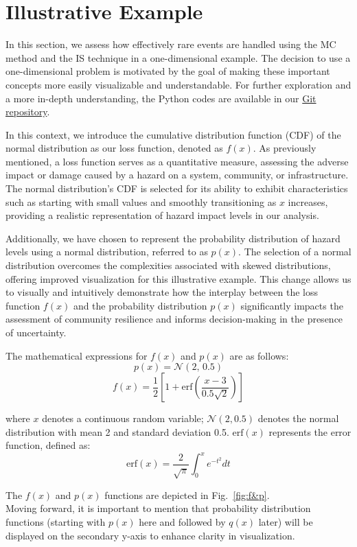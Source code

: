 \section{Illustrative Example}
    In this section, we assess how effectively rare events are handled using the MC method and the IS technique in a one-dimensional example. The decision to use a one-dimensional problem is motivated by the goal of making these important concepts more easily visualizable and understandable. For further exploration and a more in-depth understanding, the Python codes are available in our \href{https://github.com/ZeinabFarah/Navigating-Uncertainty-in-Resilience-Planning-A-Comparative-Analysis-of-Hazard-Scenario-Generation.git}{Git repository}.

    In this context, we introduce the cumulative distribution function (CDF) of the normal distribution as our loss function, denoted as $f(x)$. As previously mentioned, a loss function serves as a quantitative measure, assessing the adverse impact or damage caused by a hazard on a system, community, or infrastructure. The normal distribution's CDF is selected for its ability to exhibit characteristics such as starting with small values and smoothly transitioning as $x$ increases, providing a realistic representation of hazard impact levels in our analysis.    
    
    Additionally, we have chosen to represent the probability distribution of hazard levels using a normal distribution, referred to as $p(x)$. The selection of a normal distribution overcomes the complexities associated with skewed distributions, offering improved visualization for this illustrative example. This change allows us to visually and intuitively demonstrate how the interplay between the loss function $f(x)$ and the probability distribution $p(x)$ significantly impacts the assessment of community resilience and informs decision-making in the presence of uncertainty.

    The mathematical expressions for $f(x)$ and $p(x)$ are as follows:
    $$p(x)=\mathcal{N}(2,\,0.5)$$
    $$f(x) = \frac{1}{2}[1 + \text{erf}(\frac{x - 3}{0.5\sqrt{2}})]$$
    
    where $x$ denotes a continuous random variable; $\mathcal{N}(2, 0.5)$ denotes the normal distribution with mean 2 and standard deviation 0.5. $\text{erf}(x)$ represents the error function, defined as:
    $$\text{erf}(x) = \frac{2}{\sqrt{\pi}} \int_0^x e^{-t^2} dt$$
        
    The $f(x)$ and $p(x)$ functions are depicted in Fig.~\ref{fig:f&p}. \\
    Moving forward, it is important to mention that probability distribution functions (starting with $p(x)$ here and followed by $q(x)$ later) will be displayed on the secondary y-axis to enhance clarity in visualization.
   
